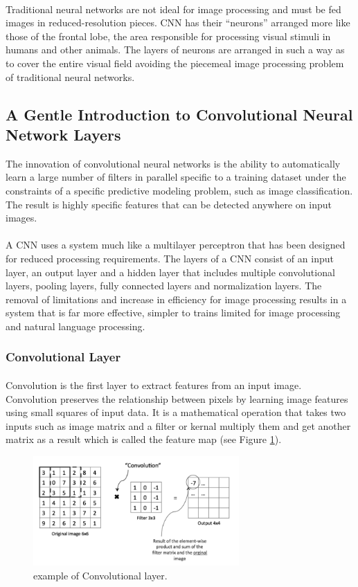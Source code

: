 \paragraph{}
Traditional neural networks are not ideal for image processing and must be fed images in reduced-resolution pieces. CNN has their “neurons” arranged more like those of the frontal lobe, the area responsible for processing visual stimuli in humans and other animals. The layers of neurons are arranged in such a way as to cover the entire visual field avoiding the piecemeal image processing problem of traditional neural networks.

\subsection{A Gentle Introduction to Convolutional Neural Network Layers }   
The innovation of convolutional neural networks is the ability to automatically learn a large number of filters in parallel specific to a training dataset under the constraints of a specific predictive modeling problem, such as image classification. The result is highly specific features that can be detected anywhere on input images.
\paragraph{}
A CNN uses a system much like a multilayer perceptron that has been designed for reduced processing requirements. The layers of a CNN consist of an input layer, an output layer and a hidden layer that includes multiple convolutional layers, pooling layers, fully connected layers and normalization layers. The removal of limitations and increase in efficiency for image processing results in a system that is far more effective, simpler to trains limited for image processing and natural language processing.
\subsubsection{Convolutional Layer}
\paragraph{}
Convolution is the first layer to extract features from an input image. Convolution preserves the relationship between pixels by learning image features using small squares of input data. It is a mathematical operation that takes two inputs such as image matrix and a filter or kernal multiply them and get another matrix as a result which  is called the feature map (see Figure \ref{conv}).
\begin{figure}[H]
	\centering
	\includegraphics[width=0.7\textwidth]{conv_layer.png}
	\caption{example of Convolutional layer.}
	\label{conv}
\end{figure}
